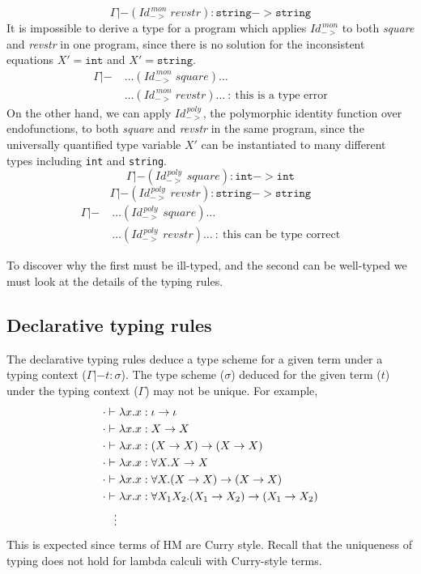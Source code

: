 \[ \Gamma |-
        (\textit{Id}_{->}^{\,\textit{mon}}\;\textit{revstr}) :
        \texttt{string} -> \texttt{string}
\]
It is impossible to derive a type for a program which applies
$\textit{Id}_{->}^{\,\textit{mon}}$ to both \textit{square} and \textit{revstr} 
in one program, since there is no solution for the inconsistent equations
$X'=\mathtt{int}$ and $X'=\mathtt{string}$.
\begin{align*}
\Gamma |- \;
& \dots (\textit{Id}_{->}^{\,\textit{mon}}\;\textit{square}) \dots \\
& \dots (\textit{Id}_{->}^{\,\textit{mon}}\;\textit{revstr}) \dots
~:~ \text{this is a type error}
\end{align*}
On the other hand, we can apply $\textit{Id}_{->}^{\,\textit{poly}}$,
the polymorphic identity function over endofunctions, to both
\textit{square} and \textit{revstr} in the same program, since
the universally quantified type variable $X'$ can be instantiated
to many different types including \texttt{int} and \texttt{string}.
\[ \Gamma |-
        (\textit{Id}_{->}^{\,\textit{poly}}\;\textit{square}) :
        \texttt{int} -> \texttt{int}
\]
\[ \Gamma |-
        (\textit{Id}_{->}^{\,\textit{poly}}\;\textit{revstr}) :
        \texttt{string} -> \texttt{string}
\]
\begin{align*}
\Gamma |-\;
& \dots (\textit{Id}_{->}^{\,\textit{poly}}\;\textit{square}) \dots \\
& \dots (\textit{Id}_{->}^{\,\textit{poly}}\;\textit{revstr}) \dots
~:~ \text{this can be type correct}
\end{align*}

To discover why the first must be ill-typed, and the second can be well-typed
we must look at the details of the typing rules.

\subsection{Declarative typing rules}\label{sec:hm:dectyrule}
The declarative typing rules deduce a type scheme for a given term under
a typing context ($\Gamma |- t : \sigma$). The type scheme ($\sigma$)
deduced for the given term ($t$) under the typing context ($\Gamma$) may not
be unique. For example,
\begin{align*}
        &\cdot |- \lambda x.x: \iota -> \iota \\
        &\cdot |- \lambda x.x: X -> X \\
        &\cdot |- \lambda x.x: (X -> X) -> (X -> X) \\
        &\cdot |- \lambda x.x: \forall X.X -> X \\
        &\cdot |- \lambda x.x: \forall X.(X -> X) -> (X -> X) \\
        &\cdot |- \lambda x.x: \forall X_1 X_2.(X_1 -> X_2) -> (X_1 -> X_2) \\
        &\quad \vdots
\end{align*}
This is expected since terms of HM are Curry style. Recall that
the uniqueness of typing does not hold for lambda calculi with
Curry-style terms.

